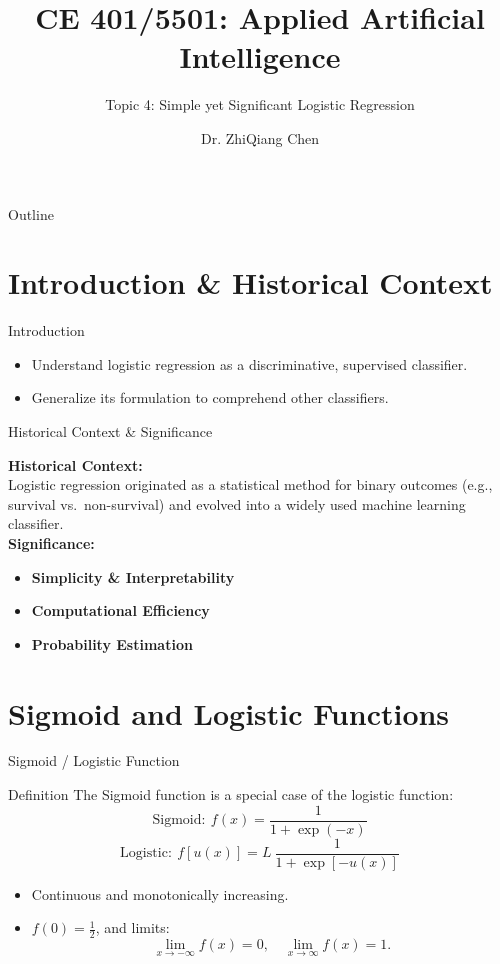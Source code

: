 \documentclass{beamer}
\title{CE 401/5501: Applied Artificial Intelligence}
\subtitle{Topic 4: Simple yet Significant Logistic Regression}
\author{Dr. ZhiQiang Chen}
\date{}
\begin{document}
\begin{frame}
  \titlepage
\end{frame}

\begin{frame}{Outline}
  \tableofcontents
\end{frame}

\section{Introduction \& Historical Context}
\begin{frame}{Introduction}
  \begin{itemize}
    \item Understand logistic regression as a discriminative, supervised classifier.
    \item Generalize its formulation to comprehend other classifiers.
  \end{itemize}
\end{frame}

\begin{frame}{Historical Context \& Significance}
  \begin{tcolorbox}[colback=blue!5!white,colframe=blue!75!black]
    \textbf{Historical Context:}\\[1ex]
    Logistic regression originated as a statistical method for binary outcomes (e.g., survival vs.\ non-survival) and evolved into a widely used machine learning classifier.\\[1ex]
    \textbf{Significance:}
    \begin{itemize}
      \item \textbf{Simplicity \& Interpretability}
      \item \textbf{Computational Efficiency}
      \item \textbf{Probability Estimation}
    \end{itemize}
  \end{tcolorbox}
\end{frame}

\section{Sigmoid and Logistic Functions}
\begin{frame}{Sigmoid / Logistic Function}
  \begin{block}{Definition}
    The Sigmoid function is a special case of the logistic function:
    \[
    \mathrm{Sigmoid:}\ f(x) = \frac{1}{1 + \exp(-x)}
    \]
      \[
     \mathrm{Logistic:}\  f[u(x)] = L\ \frac{1}{1 + \exp[-u(x)]}
    \]
  \end{block}
  \begin{itemize}
    \item Continuous and monotonically increasing.
    \item $f(0)=\frac{1}{2}$, and limits:
      \[
      \lim_{x \to -\infty} f(x) = 0,\quad \lim_{x \to \infty} f(x) = 1.
      \]
  \end{itemize}
\end{frame}
\end{document}
